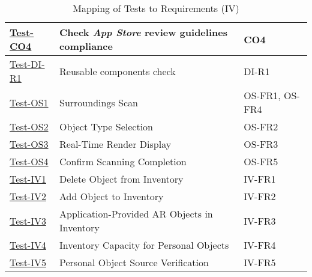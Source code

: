 \documentclass[12pt, titlepage]{article}
\begin{document}
\begin{table}[htpb!]
\begin{tabular}{|l|p{8cm}|p{3cm}|}
        \hline
        \hyperref[itm:Test-CO4]{Test-CO4} & Check \textit{App Store} review guidelines \cite{AppStore} compliance & CO4 \\
        \hline
        \hyperref[itm:Test-DI-R1]{Test-DI-R1} & Reusable components check & DI-R1 \\
        \hline
        \hyperref[itm:Test-OS1]{Test-OS1} & Surroundings Scan & OS-FR1, OS-FR4 \\
        \hline
        \hyperref[itm:Test-OS2]{Test-OS2} & Object Type Selection & OS-FR2 \\
        \hline
        \hyperref[itm:Test-OS3]{Test-OS3} & Real-Time Render Display & OS-FR3 \\
        \hline
        \hyperref[itm:Test-OS4]{Test-OS4} & Confirm Scanning Completion & OS-FR5 \\
        \hline
        \hyperref[itm:Test-IV1]{Test-IV1} & Delete Object from Inventory & IV-FR1 \\
        \hline
        \hyperref[itm:Test-IV2]{Test-IV2} & Add Object to Inventory & IV-FR2 \\
        \hline
        \hyperref[itm:Test-IV3]{Test-IV3} & Application-Provided AR Objects in Inventory & IV-FR3 \\
        \hline
        \hyperref[itm:Test-IV4]{Test-IV4} & Inventory Capacity for Personal Objects & IV-FR4 \\
        \hline
        \hyperref[itm:Test-IV5]{Test-IV5} & Personal Object Source Verification & IV-FR5 \\
        \hline
    \end{tabular}
    \caption{Mapping of Tests to Requirements (IV)}
    \label{tab:test_requirements4}
\end{table}
\end{document}
